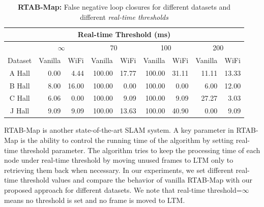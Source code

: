 \begin{table}
\caption{{\bf RTAB-Map:} False negative loop closures for different datasets and different {\it real-time thresholds}}
\begin{center}
\begin{tabular}{| c | r r | r r | r r | r r | } 
\hline 
\multicolumn{9}{|c|}{Real-time Threshold (ms)} \\ 
\hline 
 & \multicolumn{2}{|c|}{$\infty$} & \multicolumn{2}{|c|}{70} & \multicolumn{2}{|c|}{100} & \multicolumn{2}{|c|}{200} \\ 
\hline 
 Dataset & \multicolumn{1}{|c|}{Vanilla} & \multicolumn{1}{|c|}{WiFi} & \multicolumn{1}{|c|}{Vanilla} & \multicolumn{1}{|c|}{WiFi} & \multicolumn{1}{|c|}{Vanilla} & \multicolumn{1}{|c|}{WiFi} & \multicolumn{1}{|c|}{Vanilla} & \multicolumn{1}{|c|}{WiFi} \\ 
\hline 
 A Hall & 0.00 & 4.44 & 100.00 & 17.77 & 100.00 & 31.11 & 11.11 & 13.33 \\ 
 B Hall & 8.00 & 16.00 & 100.00 & 0.00 & 100.00 & 0.00 & 6.00 & 12.00 \\ 
 C Hall & 6.06 & 0.00 & 100.00 & 9.09 & 100.00 & 9.09 & 27.27 & 3.03 \\ 
 J Hall & 9.09 & 9.09 & 100.00 & 13.63 & 100.00 & 40.90 & 0.00 & 9.09 \\ 
\hline 
\end{tabular} 
\label{table:rtabmap_false_negative}
\end{center}
\end{table}
RTAB-Map is another state-of-the-art SLAM system. A key parameter in RTAB-Map is the ability to control the running time of the algorithm by setting {real-time threshold} parameter. 
The algorithm tries to keep the processing time of each node under {real-time threshold} by moving unused frames to LTM only to retrieving them back when necessary. 
In our experiments, we set different real-time threshold values and compare the behavior of vanilla RTAB-Map with our proposed approach for different datasets. 
We note that {real-time threshold}=$\infty$ means no threshold is set and no frame is moved to LTM.

